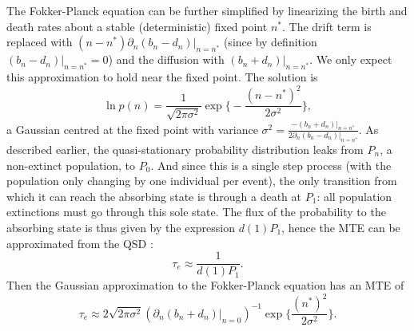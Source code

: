 The Fokker-Planck equation can be further simplified by linearizing the birth and death rates about a stable (deterministic) fixed point $n^*$. 
The drift term is replaced with $(n-n^*)\partial_n(b_n - d_n)|_{n=n^*}$ (since by definition $(b_n - d_n)|_{n=n^*}=0$) and the diffusion with $(b_n + d_n)|_{n=n^*}$. 
We only expect this approximation to hold near the fixed point. 
The solution is 
\begin{equation}
\ln p (n) = \frac{1}{\sqrt{2\pi\sigma^{2}}}\exp\Big\lbrace-\frac{(n-n^*)^2}{2\sigma^{2}}\Big\rbrace,
 \label{FP-gaussian}
\end{equation}
a Gaussian centred at the fixed point with variance $\sigma^2=\frac{-(b_n + d_n)|_{n=n^*}}{2\partial_n(b_n - d_n)|_{n=n^*}}$. 
As described earlier, the quasi-stationary probability distribution leaks from $P_n$, a non-extinct population, to $P_0$.
And since this is a single step process (with the population only changing by one individual per event), the only transition from which it can reach the absorbing state is through a death at $P_1$: all population extinctions must go through this sole state. 
The flux of the probability to the absorbing state is thus given by the expression $d(1)P_1$, hence the MTE can be approximated from the QSD \cite{Assaf2016}:
\begin{equation}
\tau_e \approx \frac{1}{d(1)P_1}.
 \label{1overd1P1}
\end{equation}
Then the Gaussian approximation to the Fokker-Planck equation has an MTE of
\begin{equation}
\tau_e \approx 2\sqrt{2\pi\sigma^{2}} \left( \partial_n(b_n + d_n)|_{n=0} \right)^{-1} \exp\Big\{\frac{(n^*)^2}{2\sigma^{2}}\Big\}. 
\end{equation}

